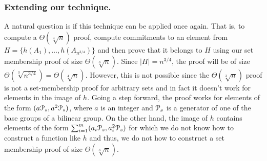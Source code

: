
\subsubsection{Extending our technique.}
A natural question is if this technique can be applied once again. That is, to compute a $\Theta(\sqrt[4]{n})$  proof, compute commitments to an element from $H=\{h(A_1),\ldots,h(A_{n^{3/4}})\}$
and then prove that it belongs to $H$ using our set membership proof of size $\Theta(\sqrt[3]{n})$. Since $|H|=n^{3/4}$, the proof will be of size $\Theta(\sqrt[3]{n^{3/4}})=\Theta(\sqrt[4]{n})$. However, this is not possible since the $\Theta(\sqrt[3]{n})$ proof is not a set-membership proof for arbitrary sets and in fact it doesn't work for elements in the image of $h$. Going a step forward, the proof works for elements of the form $(a\mathcal{P}_s,a^2\mathcal{P}_s)$, where $a$ is an integer and $\mathcal{P}_s$ is a generator of one of the base groups of a bilinear group. On the other hand, the image of $h$ contains elements of the form $\sum_{i=1}^m (a_i\mathcal{P}_s,a_i^2\mathcal{P}_s)$ for which we do not know how to construct a function like $h$ and thus, we do not how to construct a set membership proof of size $\Theta(\sqrt[3]{n})$.




